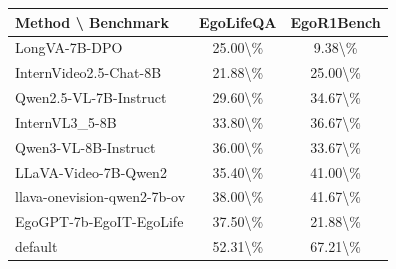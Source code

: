 \documentclass{article}%
\begin{document}
%
\normalsize%
\begin{tabular}{lcc}%
Method \textbackslash{} Benchmark&EgoLifeQA&EgoR1Bench\\%
\hline%
LongVA{-}7B{-}DPO&25.00\textbackslash{}\%&9.38\textbackslash{}\%\\%
InternVideo2.5{-}Chat{-}8B&21.88\textbackslash{}\%&25.00\textbackslash{}\%\\%
Qwen2.5{-}VL{-}7B{-}Instruct&29.60\textbackslash{}\%&34.67\textbackslash{}\%\\%
InternVL3\_5{-}8B&33.80\textbackslash{}\%&36.67\textbackslash{}\%\\%
Qwen3{-}VL{-}8B{-}Instruct&36.00\textbackslash{}\%&33.67\textbackslash{}\%\\%
LLaVA{-}Video{-}7B{-}Qwen2&35.40\textbackslash{}\%&41.00\textbackslash{}\%\\%
llava{-}onevision{-}qwen2{-}7b{-}ov&38.00\textbackslash{}\%&41.67\textbackslash{}\%\\%
EgoGPT{-}7b{-}EgoIT{-}EgoLife&37.50\textbackslash{}\%&21.88\textbackslash{}\%\\%
default&52.31\textbackslash{}\%&67.21\textbackslash{}\%\\%
\end{tabular}%
\end{document}
